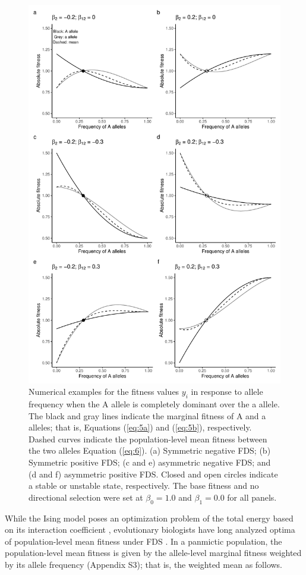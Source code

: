 \documentclass[12pt,]{article}
\begin{document}
\begin{figure}[]
  \includegraphics[width=0.7\linewidth]{AsymFDSdomi.pdf}
  \caption{Numerical examples for the fitness values $y_i$ in response to allele frequency when the A allele is completely dominant over the a allele. The black and gray lines indicate the marginal fitness of A and a alleles; that is, Equations (\ref{eq:5a}) and (\ref{eq:5b}), respectively. Dashed curves indicate the population-level mean fitness between the two alleles Equation (\ref{eq:6}). (a) Symmetric negative FDS; (b) Symmetric positive FDS; (c and e) asymmetric negative FDS; and (d and f) asymmetric positive FDS. Closed and open circles indicate a stable or unstable state, respectively. The base fitness and no directional selection were set at $\beta_0=1.0$ and $\beta_1=0.0$ for all panels.}
  \label{fig2:asym}
\end{figure}


While the Ising model poses an optimization problem of the total energy based on its interaction coefficient \citep{cipra1987introduction, anderson1991two, prugel1997dynamics}, evolutionary biologists have long analyzed optima of population-level mean fitness under FDS \citep{cockerham1972frequency,schneider_maximization_2008,takahashi2018balanced}. In a panmictic population, the population-level mean fitness is given by the allele-level marginal fitness weighted by its allele frequency (Appendix S3); that is, the weighted mean as follows.
\end{document}

